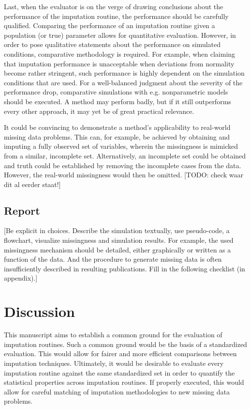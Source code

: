 \documentclass[bimj,fleqn]{w-art}
\begin{document}
Last, when the evaluator is on the verge of drawing conclusions about the performance of the imputation routine, the performance should be carefully qualified. Comparing the performance of an imputation routine given a population (or true) parameter allows for quantitative evaluation. However, in order to pose qualitative statements about the performance on simulated conditions, comparative methodology is required. For example, when claiming that imputation performance is unacceptable when deviations from normality become rather stringent, such performance is highly dependent on the simulation conditions that are used. For a well-balanced judgment about the severity of the performance drop, comparative simulations with e.g. nonparametric models should be executed. A method may perform badly, but if it still outperforms every other approach, it may yet be of great practical relevance.

It could be convincing to demonstrate a method's applicability to real-world missing data problems. This can, for example, be achieved by obtaining and imputing a fully observed set of variables, wherein the missingness is mimicked from a similar, incomplete set. Alternatively, an incomplete set could be obtained and truth could be established by removing the incomplete cases from the data. However, the real-world missingness would then be omitted. [TODO: check waar dit al eerder staat!]



\subsection{Report}

[Be explicit in choices. Describe the simulation textually, use pseudo-code, a flowchart, visualize missingness and simulation results. For example, the used missingness mechanism should be detailed, either graphically or written as a function of the data. And the procedure to generate missing data is often insufficiently described in resulting publications. Fill in the following checklist (in appendix).]



\section{Discussion}

This manuscript aims to establish a common ground for the evaluation of imputation routines. Such a common ground would be the basis of a standardized evaluation. This would allow for fairer and more efficient comparisons between imputation techniques. Ultimately, it would be desirable to evaluate every imputation routine against the same standardized set in order to quantify the statistical properties across imputation routines. If properly executed, this would allow for careful matching of imputation methodologies to new missing data problems. 
\end{document}
